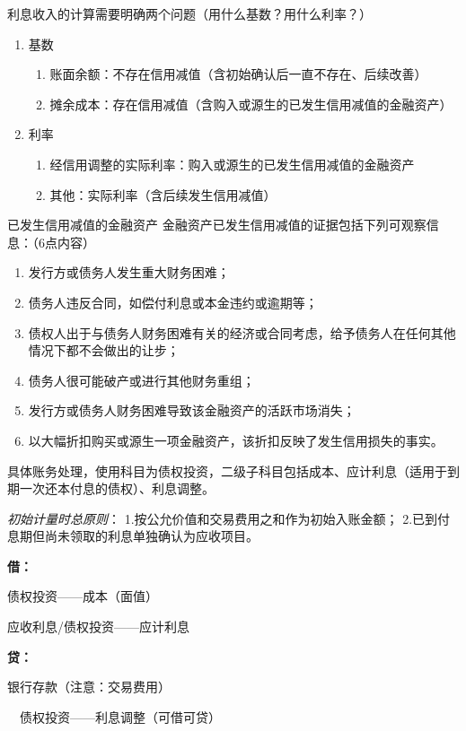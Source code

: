 \documentclass[UTF8,12pt]{ctexart}
\newenvironment{Dr}{%
	\begin{list}{}%
		{
			\setlength{\leftmargin}{2em}
			\setlength{\labelwidth}{2em}
			\setlength{\labelsep}{0pt}
			\setlength{\itemindent}{0pt}
			\setlength{\listparindent}{0pt}
			\setlength{\parsep}{0pt}
			\setlength{\topsep}{0pt}
		}
		\item[\textbf{借：}]
	}{%
	\end{list}
}
\newenvironment{Cr}{%
	\begin{list}{}%
		{
			\setlength{\leftmargin}{2em}
			\setlength{\labelwidth}{2em}
			\setlength{\labelsep}{0pt}
			\setlength{\itemindent}{0pt}
			\setlength{\listparindent}{0pt}
			\setlength{\parsep}{0pt}
			\setlength{\topsep}{0pt}
		}
		\item[\textbf{贷：}]
	}{%
	\end{list}
}
\numberwithin{equation}{section} %
\numberwithin{figure}{section}
\numberwithin{table}{section}
\begin{document}
	利息收入的计算需要明确两个问题（用什么基数？用什么利率？）
	\begin{enumerate}
		\item 基数
		\begin{enumerate}
			\item 账面余额：不存在信用减值（含初始确认后一直不存在、后续改善）
			
			\item 摊余成本：存在信用减值（含购入或源生的已发生信用减值的金融资产）
		\end{enumerate}
		
		\item 利率
		\begin{enumerate}
			\item 经信用调整的实际利率：购入或源生的已发生信用减值的金融资产
			
			\item 其他：实际利率（含后续发生信用减值）
		\end{enumerate}
	\end{enumerate}

	已发生信用减值的金融资产
	金融资产已发生信用减值的证据包括下列可观察信息：（6点内容）
	\begin{enumerate}
		\item 发行方或债务人发生重大财务困难；
		
		\item 债务人违反合同，如偿付利息或本金违约或逾期等；
		
		\item 债权人出于与债务人财务困难有关的经济或合同考虑，给予债务人在任何其他情况下都不会做出的让步；
		
		\item 债务人很可能破产或进行其他财务重组；
		
		\item 发行方或债务人财务困难导致该金融资产的活跃市场消失；
		
		\item 以大幅折扣购买或源生一项金融资产，该折扣反映了发生信用损失的事实。
	\end{enumerate}
	
	具体账务处理，使用科目为债权投资，二级子科目包括成本、应计利息（适用于到期一次还本付息的债权）、利息调整。
	
	\textit{初始计量时总原则}：
	1.按公允价值和交易费用之和作为初始入账金额；
	2.已到付息期但尚未领取的利息单独确认为应收项目。
	
	\begin{Dr}
		债权投资——成本（面值）
		
		应收利息/债权投资——应计利息
	\end{Dr}
	\begin{Cr}
		银行存款（注意：交易费用）
		
		\ \ 债权投资——利息调整（可借可贷）
	\end{Cr}
	
\end{document}
